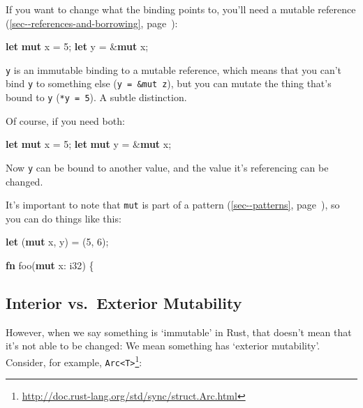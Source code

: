 \documentclass[a4paper,]{book}
\renewcommand*{\hyperref}[2][\ar]{%
  \def\ar{#2}%
  #2 (\autoref{#1}, page~\pageref{#1})}
\newenvironment{Shaded}{\begin{snugshade}}{\end{snugshade}}
\newcommand{\KeywordTok}[1]{\textcolor[rgb]{0.13,0.29,0.53}{\textbf{{#1}}}}
\newcommand{\DataTypeTok}[1]{\textcolor[rgb]{0.13,0.29,0.53}{{#1}}}
\newcommand{\DecValTok}[1]{\textcolor[rgb]{0.00,0.00,0.81}{{#1}}}
\newcommand{\NormalTok}[1]{{#1}}
\renewcommand{\href}[2]{#2\footnote{\url{#1}}}
\begin{document}
If you want to change what the binding points to, you'll need a
\hyperref[sec--references-and-borrowing]{mutable reference}:

\begin{Shaded}
\begin{Highlighting}[]
\KeywordTok{let} \KeywordTok{mut} \NormalTok{x = }\DecValTok{5}\NormalTok{;}
\KeywordTok{let} \NormalTok{y = &}\KeywordTok{mut} \NormalTok{x;}
\end{Highlighting}
\end{Shaded}

\texttt{y} is an immutable binding to a mutable reference, which means
that you can't bind \texttt{y} to something else
(\texttt{y\ =\ \&mut\ z}), but you can mutate the thing that's bound to
\texttt{y} (\texttt{*y\ =\ 5}). A subtle distinction.

Of course, if you need both:

\begin{Shaded}
\begin{Highlighting}[]
\KeywordTok{let} \KeywordTok{mut} \NormalTok{x = }\DecValTok{5}\NormalTok{;}
\KeywordTok{let} \KeywordTok{mut} \NormalTok{y = &}\KeywordTok{mut} \NormalTok{x;}
\end{Highlighting}
\end{Shaded}

Now \texttt{y} can be bound to another value, and the value it's
referencing can be changed.

It's important to note that \texttt{mut} is part of a
\hyperref[sec--patterns]{pattern}, so you can do things like this:

\begin{Shaded}
\begin{Highlighting}[]
\KeywordTok{let} \NormalTok{(}\KeywordTok{mut} \NormalTok{x, y) = (}\DecValTok{5}\NormalTok{, }\DecValTok{6}\NormalTok{);}

\KeywordTok{fn} \NormalTok{foo(}\KeywordTok{mut} \NormalTok{x: }\DataTypeTok{i32}\NormalTok{) \{}
\end{Highlighting}
\end{Shaded}

\subsection{Interior vs.~Exterior
Mutability}\label{interior-vs.exterior-mutability}

However, when we say something is `immutable' in Rust, that doesn't mean
that it's not able to be changed: We mean something has `exterior
mutability'. Consider, for example,
\href{http://doc.rust-lang.org/std/sync/struct.Arc.html}{\texttt{Arc\textless{}T\textgreater{}}}:
\end{document}
